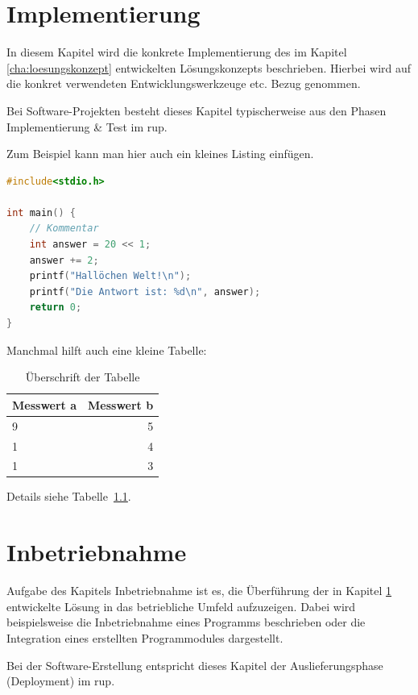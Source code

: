 \documentclass[oneside]{ausarbeitung}
\begin{document}
\chapter{Implementierung}
\label{cha:implementierung}

In diesem Kapitel wird die konkrete Implementierung des im Kapitel
\ref{cha:loesungskonzept} entwickelten Lösungskonzepts beschrieben.
Hierbei wird auf die konkret verwendeten Entwicklungswerkzeuge etc. 
Bezug genommen.

Bei Software-Projekten besteht dieses Kapitel typischerweise aus den 
Phasen Implementierung \& Test im \ac{rup}.

Zum Beispiel kann man hier auch ein kleines Listing einfügen.

\begin{lstlisting}[language=c,%
                   caption={Überschrift des Quelltexts}]
#include<stdio.h>

int main() {
    // Kommentar
    int answer = 20 << 1;
    answer += 2;
    printf("Hallöchen Welt!\n");
    printf("Die Antwort ist: %d\n", answer);
    return 0;
}
\end{lstlisting}

Manchmal hilft auch eine kleine Tabelle:

\begin{table}[htbp]
\centering
\begin{tabular}{|l|r|}
\hline
\textbf{Messwert a} & \textbf{Messwert b} \\ \hline
9 & 5 \\ \hline
1 & 4 \\ \hline
1 & 3 \\ \hline
\end{tabular}
\caption{Überschrift der Tabelle}
\label{tab:my-table}
\end{table}

Details siehe Tabelle~\ref{tab:my-table}.
\chapter{Inbetriebnahme}
\label{cha:inbetriebnahme}

Aufgabe des Kapitels Inbetriebnahme ist es, die Überführung der in 
Kapitel \ref{cha:implementierung} entwickelte Lösung in das betriebliche 
Umfeld aufzuzeigen. Dabei wird beispielsweise die Inbetriebnahme eines 
Programms beschrieben oder die Integration eines erstellten 
Programmodules dargestellt.

Bei der Software-Erstellung entspricht dieses Kapitel der 
Auslieferungsphase (Deployment) im \ac{rup}.
\end{document}

